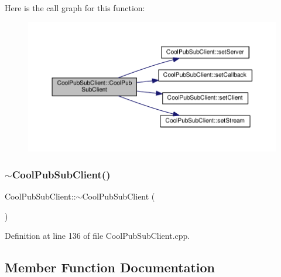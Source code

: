 Here is the call graph for this function\+:
\nopagebreak
\begin{figure}[H]
\begin{center}
\leavevmode
\includegraphics[width=350pt]{class_cool_pub_sub_client_a6466f55abe5820d410b1c9cf7a70ec7e_cgraph}
\end{center}
\end{figure}
\mbox{\label{class_cool_pub_sub_client_aa9404bea508c0755d3d3ea29e921d60f}} 
\subsubsection{\texorpdfstring{$\sim$\+Cool\+Pub\+Sub\+Client()}{~CoolPubSubClient()}}
{\footnotesize\ttfamily Cool\+Pub\+Sub\+Client\+::$\sim$\+Cool\+Pub\+Sub\+Client (\begin{DoxyParamCaption}{ }\end{DoxyParamCaption})}



Definition at line 136 of file Cool\+Pub\+Sub\+Client.\+cpp.



\subsection{Member Function Documentation}
\mbox{\label{class_cool_pub_sub_client_a2664c2ebc302b2fa49f493a339ecc891}} 
